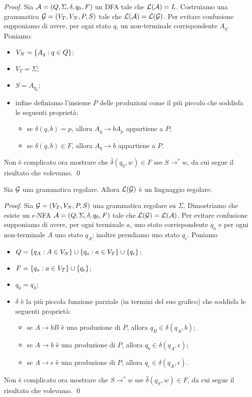 \documentclass[runningheads,a4paper]{llncs}
\begin{document}
\begin{proof}
Sia $\mathcal{A}=(Q,\Sigma,\delta,q_0,F)$ un DFA tale che $\mathcal{L}(\mathcal{A}) = L$. Costruiamo una grammatica $\mathcal{G} = (V_T,V_N,P,S)$ tale che $\mathcal{L}(\mathcal{A}) = \mathcal{L}(\mathcal{G})$. Per evitare confusione supponiamo di avere, per ogni stato $q$, un non-terminale corrispondente $A_q$. Poniamo:
\begin{itemize}
\item $V_N = \{A_q : q \in Q\}$;
\item $V_T = \Sigma$;
\item $S = A_{q_0}$;
\item infine definiamo l'insieme $P$ delle produzioni come il pi\`{u} piccolo che soddisfa le seguenti propriet\`{a}:
\begin{itemize}
\item se $\delta(q,b) = p$, allora $A_q \to bA_p$ appartiene a $P$;
\item se $\delta(q,b) \in F$, allora $A_q \to b$ appartiene a $P$.
\end{itemize}
\end{itemize}
Non \`{e}  complicato ora mostrare che $\hat{\delta}(q_0,w) \in F$ sse $S \to^* w$, da cui segue il risultato che volevamo.
\qed\end{proof}

\begin{theorem}\label{thm:ling-reg-gramm2}
Sia $\mathcal{G}$ una grammatica regolare. Allora $\mathcal{L}(\mathcal{G})$ \`{e} un linguaggio regolare.
\end{theorem}

\begin{proof}
Sia $\mathcal{G} = (V_T,V_N,P,S)$ una grammatica regolare su $\Sigma$. Dimostriamo che esiste un $\epsilon$-NFA $\mathcal{A}=(Q,\Sigma,\delta,q_0,F)$ tale che $\mathcal{L}(\mathcal{G}) = \mathcal{L}(\mathcal{A})$. Per evitare confusione supponiamo di avere, per ogni terminale $a$, uno stato corrispondente $q_a$ e per ogni non-terminale $A$ uno stato $q_A$; inoltre prendiamo uno stato $q_\epsilon$. Poniamo
\begin{itemize}
\item $Q = \{q_A : A \in V_N\} \cup \{q_a : a \in V_T\} \cup \{q_\epsilon\}$;
\item $F = \{q_a : a \in V_T\} \cup \{q_\epsilon\}$;
\item $q_0 = q_S$;
\item $\delta$ \`{e} la pi\`{u} piccola funzione parziale (in termini del suo grafico) che soddisfa le seguenti propriet\`{a}:
\begin{itemize}
\item se $A \to bB$ \`{e} una produzione di $P$, allora $q_B \in \delta(q_A,b)$;
\item se $A \to b$ \`{e} una produzione di $P$, allora $q_b \in \delta(q_A,\epsilon)$;
\item se $A \to \epsilon$ \`{e} una produzione di $P$, allora $q_\epsilon \in \delta(q_A,\epsilon)$.
\end{itemize}
\end{itemize}
Non \`{e}  complicato ora mostrare che $S \to^* w$ sse $\hat{\delta}(q_S,w) \in F$, da cui segue il risultato che volevamo.
\qed\end{proof}
\end{document}
